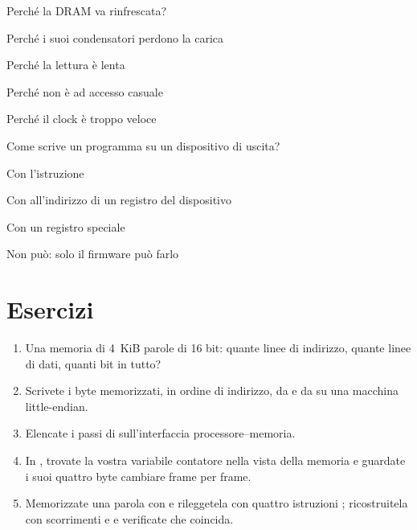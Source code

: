 \begin{quiz}{Perché la DRAM va rinfrescata?}
\item Perché i suoi condensatori perdono la carica
\item Perché la lettura è lenta
\item Perché non è ad accesso casuale
\item Perché il clock è troppo veloce
\end{quiz}

\begin{quiz}{Come scrive un programma \riscv su un dispositivo di uscita?}
\item Con l'istruzione 
\item Con  all'indirizzo di un registro del dispositivo
\item Con un registro speciale 
\item Non può: solo il firmware può farlo
\end{quiz}

\section{Esercizi}

\begin{exercise}
\begin{enumerate}[nosep]
\item Una memoria di 4~KiB parole di 16 bit: quante linee di indirizzo, quante
  linee di dati, quanti bit in tutto?
\item Scrivete i byte memorizzati, in ordine di indirizzo, da
   e da  su una macchina
  little-endian.
\item Elencate i passi di  sull'interfaccia
  processore--memoria.
\item In \prgqt, trovate la vostra variabile contatore nella vista della
  memoria e guardate i suoi quattro byte cambiare frame per frame.
\item Memorizzate una parola con  e rileggetela con quattro istruzioni
  ; ricostruitela con scorrimenti e  e verificate che
  coincida.
\end{enumerate}
\end{exercise}

